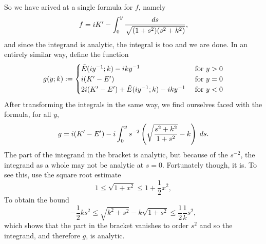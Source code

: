 So we have arived at a single formula for $f$, namely
\[
f = i K' - \int_0^y \frac{ds}{\sqrt{(1+s^2)(s^2+k^2)}},
\]
and since the integrand is analytic, the integral is too and we are done. In an entirely similar way, define the function
\[
g(y;k) :=
\begin{cases}
\tilde E(i y^{-1}; k) - i ky^{-1}             & \text{ for } y > 0 \\
i (K'-E')                                       & \text{ for } y = 0 \\
2i (K'-E') + \tilde E(i y^{-1}; k)  - i ky^{-1}  & \text{ for } y < 0
\end{cases}
\]
After transforming the integrals in the same way, we find ourselves faced with the formula, for all $y$,
\[
g = i (K'-E') - i \int_0^y s^{-2}\left( \sqrt{\frac{s^2 + k^2}{1 + s^2}} - k \right)\;ds.
\]
The part of the integrand in the bracket is analytic, but because of the $s^{-2}$, the integrand as a whole may not be analytic at $s=0$. Fortunately though, it is. To see this, use the square root estimate
\[
1 \leq \sqrt {1 + x^2} \leq 1 + \frac{1}{2}x^2,
\]
To obtain the bound
\[
-\frac{1}{2}k s^2 \leq \sqrt{k^2 + s^2} - k \sqrt{1+s^2} \leq \frac{1}{2}\frac{1}{k} s^2,
\]
which shows that the part in the bracket vanishes to order $s^2$ and so the integrand, and therefore $g$, is analytic.

